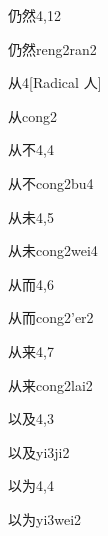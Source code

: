 \begin{entry}{仍然}{4,12}
  \begin{phonetics}{仍然}{reng2ran2}
  \end{phonetics}
\end{entry}

\begin{entry}{从}{4}[Radical ⼈]
  \begin{phonetics}{从}{cong2}
  \end{phonetics}
\end{entry}

\begin{entry}{从不}{4,4}
  \begin{phonetics}{从不}{cong2bu4}
  \end{phonetics}
\end{entry}

\begin{entry}{从未}{4,5}
  \begin{phonetics}{从未}{cong2wei4}
  \end{phonetics}
\end{entry}

\begin{entry}{从而}{4,6}
  \begin{phonetics}{从而}{cong2'er2}
  \end{phonetics}
\end{entry}

\begin{entry}{从来}{4,7}
  \begin{phonetics}{从来}{cong2lai2}
  \end{phonetics}
\end{entry}

\begin{entry}{以及}{4,3}
  \begin{phonetics}{以及}{yi3ji2}
  \end{phonetics}
\end{entry}

\begin{entry}{以为}{4,4}
  \begin{phonetics}{以为}{yi3wei2}
  \end{phonetics}
\end{entry}


